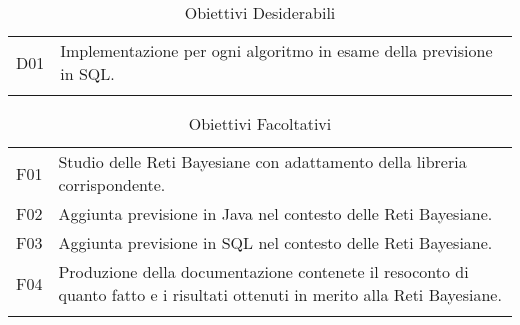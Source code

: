 {\renewcommand{\arraystretch}{2}
\begin{longtable}{|p{1cm}| p{12.25cm} |}
	\hline
	\rowcolor{blue} \multicolumn{2}{|c|}{
	{\textcolor{white}{Desiderabili}}
	} \\
		\endhead
		\hline \rowcolor{lightbrown}
		D01 & 
		Implementazione per ogni algoritmo in esame della previsione in SQL.\\	
	\hline
	\caption{Obiettivi Desiderabili}\label{tab:des-ob}
\end{longtable}}

{\renewcommand{\arraystretch}{2}
\begin{longtable}{|p{1cm}| p{12.25cm} |}
	\hline
	\rowcolor{blue} \multicolumn{2}{|c|}{
	{\textcolor{white}{Facoltativi}}
	} \\
		\endhead
		\hline \rowcolor{lightbrown}
		F01 & 
		Studio delle Reti Bayesiane con adattamento della libreria corrispondente.\\	
		\hline \rowcolor{lighterbrown}
		F02 & 
		Aggiunta previsione in Java nel contesto delle Reti Bayesiane. \\	
	\hline \rowcolor{lightbrown}
		F03 & 
		Aggiunta previsione in SQL nel contesto delle Reti Bayesiane. \\	
	\hline \rowcolor{lighterbrown}
		F04 & 
	Produzione della documentazione contenete il resoconto di quanto fatto e i risultati ottenuti in merito alla Reti Bayesiane. \\
	\hline
	\caption{Obiettivi Facoltativi}\label{tab:fac-ob}
\end{longtable}}

\pagebreak

